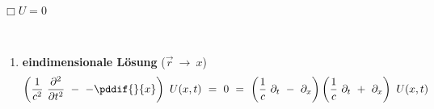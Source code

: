 $\Box U = 0$

\ \\
\begin{enumerate}\bfseries
\item \textbf{eindimensionale Lösung} ($\vec{r}\  \rightarrow \ x$)
\begin{equation*}
\left(\frac{1}{c^2} \ \pddiff{}{t} \ - \ - \pddif{}{x}\right)\ U(x,t) \ = \ 0 \ = \ \left(\frac{1}{c}\ \partial_t \ - \ \partial_x\right)\left(\frac{1}{c} \ \partial_t \ + \ \partial_x\right) \ U(x,t)
\end{equation*}

\end{enumerate}